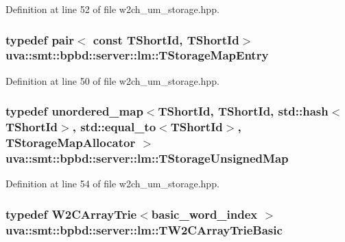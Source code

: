 Definition at line 52 of file w2ch\+\_\+um\+\_\+storage.\+hpp.

\hypertarget{namespaceuva_1_1smt_1_1bpbd_1_1server_1_1lm_af9753207e699d2eca15673a50653797e}{}
\subsubsection[{T\+Storage\+Map\+Entry}]{\setlength{\rightskip}{0pt plus 5cm}typedef pair$<$ const {\bf T\+Short\+Id}, {\bf T\+Short\+Id}$>$ {\bf uva\+::smt\+::bpbd\+::server\+::lm\+::\+T\+Storage\+Map\+Entry}}\label{namespaceuva_1_1smt_1_1bpbd_1_1server_1_1lm_af9753207e699d2eca15673a50653797e}


Definition at line 50 of file w2ch\+\_\+um\+\_\+storage.\+hpp.

\hypertarget{namespaceuva_1_1smt_1_1bpbd_1_1server_1_1lm_a26bc64a9a6f92c48c443c82b33035e60}{}
\subsubsection[{T\+Storage\+Unsigned\+Map}]{\setlength{\rightskip}{0pt plus 5cm}typedef unordered\+\_\+map$<${\bf T\+Short\+Id}, {\bf T\+Short\+Id}, std\+::hash$<${\bf T\+Short\+Id}$>$, std\+::equal\+\_\+to$<${\bf T\+Short\+Id}$>$, {\bf T\+Storage\+Map\+Allocator} $>$ {\bf uva\+::smt\+::bpbd\+::server\+::lm\+::\+T\+Storage\+Unsigned\+Map}}\label{namespaceuva_1_1smt_1_1bpbd_1_1server_1_1lm_a26bc64a9a6f92c48c443c82b33035e60}


Definition at line 54 of file w2ch\+\_\+um\+\_\+storage.\+hpp.

\hypertarget{namespaceuva_1_1smt_1_1bpbd_1_1server_1_1lm_a8b676637a8584289b226487abf0a4156}{}
\subsubsection[{T\+W2\+C\+Array\+Trie\+Basic}]{\setlength{\rightskip}{0pt plus 5cm}typedef {\bf W2\+C\+Array\+Trie}$<${\bf basic\+\_\+word\+\_\+index} $>$ {\bf uva\+::smt\+::bpbd\+::server\+::lm\+::\+T\+W2\+C\+Array\+Trie\+Basic}}\label{namespaceuva_1_1smt_1_1bpbd_1_1server_1_1lm_a8b676637a8584289b226487abf0a4156}


